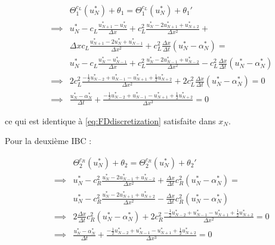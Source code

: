 \begin{equation*}
\label{eq:modifiedTBC1}
\begin{aligned}
&& &    \Theta_1^{c_L}(u_N^*) + \theta_1 = \Theta_1^{c_L}(u_N^*) + \theta_1' \\
&& \implies &    u_N^* - c_L \frac{u_{N+1}^* - u_N^*}{\Delta x} + c_L^2\frac{u_N^* - 2u_{N+1}^* + u_{N+2}^*}{\Delta x^2} + \\ 
&& & \Delta x c_L \frac{u_{N+1}^* - 2u_{N}^* + u_{N-1}^*}{\Delta x^2} + c_L^2\frac{\Delta x}{\Delta t} \left( u_{N}^* - \alpha_{N}^* \right) = \\
&& & u_N^* - c_L \frac{u_{N}^* - u_{N-1}^*}{\Delta x} + c_L^2\frac{u_N^* - 2u_{N-1}^* + u_{N-2}^*}{\Delta x^2}  - c_L^2\frac{\Delta x}{\Delta t} \left( u_{N}^* - \alpha_{N}^* \right) \\
 && \implies &    2c_L^2 \frac{-\frac{1}{2}u_{N-2}^* + u_{N-1}^* - u_{N+1}^* + \frac{1}{2}u_{N+2}^* }{\Delta x ^2}  +             2c_L^2\frac{\Delta x}{\Delta t} \left( u_{N}^* - \alpha_{N}^* \right) = 0  \\
&& \implies &    \frac{u_{N}^* - \alpha_{N}^*}{\Delta t} + \frac{-\frac{1}{2}u_{N-2}^* + u_{N-1}^* - u_{N+1}^* + \frac{1}{2}u_{N+2}^* }{\Delta x ^3} = 0
\end{aligned}
\end{equation*}

\indent ce qui est identique à \eqref{eq:FDdiscretization} satisfaite dans $x_N$.

\indent Pour la deuxième IBC : 

\begin{equation}
\label{eq:modifiedTBC2}
\begin{aligned}
&& &\Theta_2^{c_R}(u_N^*) + \theta_2 = \Theta_2^{c_R}(u_N^*) + \theta_2'  \\
&& \implies & u_N^* - c_R^2 \frac{u_N^* - 2u_{N-1}^* + u_{N-2}^*}{\Delta x^2} + \frac{\Delta x}{\Delta t} c_R^2 (u_N^* - \alpha_N^*)  = \\ && & u_N^* - c_R^2 \frac{u_N^* - 2u_{N+1}^* + u_{N+2}^*}{\Delta x^2} -\frac{\Delta x}{\Delta t} c_R^2 (u_N^* - \alpha_N^*)  \\
&& \implies & 2\frac{\Delta x}{\Delta t} c_R^2 (u_N^* - \alpha_N^*) + 2c_R^2 \frac{-\frac{1}{2}u_{N-2}^* + u_{N-1}^* - u_{N+1}^* + \frac{1}{2}u_{N+2}^* }{\Delta x^2} = 0   \\
&& \implies &\frac{u_N^* - \alpha_N^*}{\Delta t} + \frac{-\frac{1}{2}u_{N-2}^* + u_{N-1}^* - u_{N+1}^* + \frac{1}{2}u_{N+2}^* }{\Delta x^3} = 0
\end{aligned}
\end{equation}

